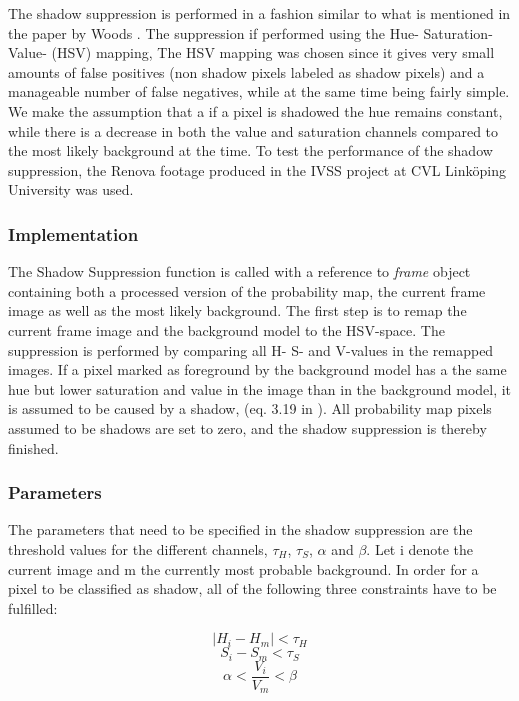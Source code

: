 The shadow suppression is performed in a fashion similar to what is mentioned in the paper by Woods \cite{Wood}. The suppression if performed using the Hue- Saturation- Value- (HSV) mapping, The HSV mapping was chosen since it gives very small amounts of false positives (non shadow pixels labeled as shadow pixels) and a manageable number of false negatives, while at the same time being fairly simple. We make the assumption that a if a pixel is shadowed the hue remains constant, while there is a decrease in both the value and saturation channels compared to the most likely background at the time. To test the performance of the shadow suppression, the Renova footage produced in the IVSS project at CVL Linköping University was used. 


\subsubsection{Implementation}
The Shadow Suppression function is called with a reference to \emph{frame} object containing both a processed version of the probability map, the current frame image as well as the most likely background. The first step is to remap the current frame image and the background model to the HSV-space. The suppression is performed by comparing all H- S- and V-values in the remapped images. If a pixel marked as foreground by the background model has a the same hue but lower saturation and value in the image than in the background model, it is assumed to be caused by a shadow, (eq. 3.19 in \cite{Wood}). All probability map pixels assumed to be shadows are set to zero, and the shadow suppression is thereby finished.

\subsubsection{Parameters}
The parameters that need to be specified in the shadow suppression are the threshold values for the different channels, $\tau_H$, $\tau_S$, $\alpha$ and $\beta$. Let i denote the current image and m the currently most probable background. In order for a pixel to be classified as shadow, all of the following three constraints have to be fulfilled:

\begin{equation}
	|H_i - H_m| < \tau_H
	\label{eq:H}
\end{equation}
\begin{equation}
	S_i - S_m < \tau_S
	\label{eq:S}
\end{equation}
\begin{equation}
	\alpha < \frac{V_i}{V_m} < \beta
	\label{eq:V}
\end{equation}

